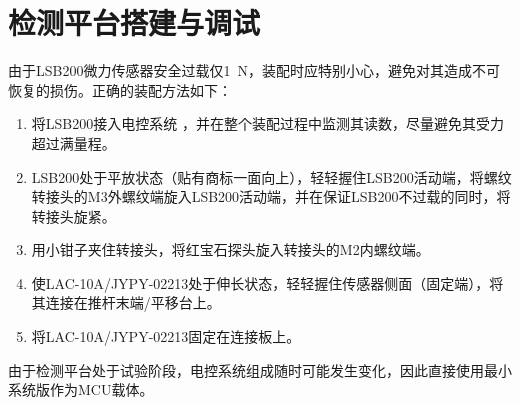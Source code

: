 \chapter{检测平台搭建与调试}\label{ch:impl}









由于LSB200微力传感器安全过载仅\SI{1}{\newton}，装配时应特别小心，避免对其造成不可恢复的损伤。正确的装配方法如下：

\begin{enumerate}
  \item
    将LSB200接入电控系统
    ，并在整个装配过程中监测其读数，尽量避免其受力超过满量程。
  \item
    LSB200处于平放状态（贴有商标一面向上），轻轻握住LSB200活动端，将螺纹转接头的M3外螺纹端旋入LSB200活动端，并在保证LSB200不过载的同时，将转接头旋紧。
  \item
    用小钳子夹住转接头，将红宝石探头旋入转接头的M2内螺纹端。
  \item
    使LAC-10A/JYPY-02213处于伸长状态，轻轻握住传感器侧面（固定端），将其连接在推杆末端/平移台上。
  \item
    将LAC-10A/JYPY-02213固定在连接板上。
\end{enumerate}


由于检测平台处于试验阶段，电控系统组成随时可能发生变化，因此直接使用最小系统版作为MCU载体。